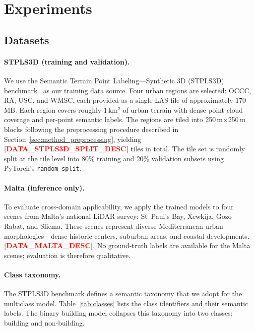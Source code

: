 \documentclass[11pt]{article}
\newcommand{\placeholder}[1]{\textcolor{red}{\textbf{[#1]}}}
\begin{document}
\section{Experiments}
\label{sec:experiments}

\subsection{Datasets}
\label{sec:experiments_datasets}

\paragraph{STPLS3D (training and validation).}
We use the Semantic Terrain Point Labeling---Synthetic 3D (STPLS3D) benchmark~\cite{hu2021stpls3d} as our training data source.
Four urban regions are selected: OCCC, RA, USC, and WMSC, each provided as a single LAS file of approximately 170\,MB.
Each region covers roughly 1\,km$^2$ of urban terrain with dense point cloud coverage and per-point semantic labels.
The regions are tiled into 250\,m$\times$250\,m blocks following the preprocessing procedure described in Section~\ref{sec:method_preprocessing}, yielding \placeholder{DATA\_STPLS3D\_SPLIT\_DESC} tiles in total.
The tile set is randomly split at the tile level into 80\% training and 20\% validation subsets using PyTorch's \texttt{random\_split}.

\paragraph{Malta (inference only).}
To evaluate cross-domain applicability, we apply the trained models to four scenes from Malta's national LiDAR survey: St~Paul's Bay, Xewkija, Gozo Rabat, and Sliema.
These scenes represent diverse Mediterranean urban morphologies---dense historic centers, suburban areas, and coastal developments.
\placeholder{DATA\_MALTA\_DESC}.
No ground-truth labels are available for the Malta scenes; evaluation is therefore qualitative.

\paragraph{Class taxonomy.}
The STPLS3D benchmark defines a semantic taxonomy that we adopt for the multiclass model.
Table~\ref{tab:classes} lists the class identifiers and their semantic labels.
The binary building model collapses this taxonomy into two classes: building and non-building.
\end{document}
